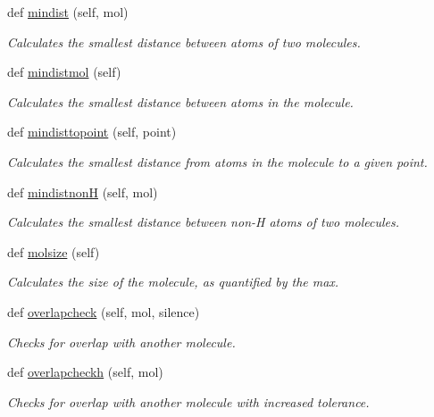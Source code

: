 \begin{DoxyCompactItemize}
def \hyperlink{classmolSimplify_1_1Classes_1_1mol3D_1_1mol3D_ab051fea5908eab8ddcd39d4ea4688657}{mindist} (self, mol)
\begin{DoxyCompactList}\small\item\em Calculates the smallest distance between atoms of two molecules. \end{DoxyCompactList}\item 
def \hyperlink{classmolSimplify_1_1Classes_1_1mol3D_1_1mol3D_abc383cd8e5f7a2963b5b220fe5f23c02}{mindistmol} (self)
\begin{DoxyCompactList}\small\item\em Calculates the smallest distance between atoms in the molecule. \end{DoxyCompactList}\item 
def \hyperlink{classmolSimplify_1_1Classes_1_1mol3D_1_1mol3D_a9002b30e6f3e13fb41c0080f4fec6ce1}{mindisttopoint} (self, point)
\begin{DoxyCompactList}\small\item\em Calculates the smallest distance from atoms in the molecule to a given point. \end{DoxyCompactList}\item 
def \hyperlink{classmolSimplify_1_1Classes_1_1mol3D_1_1mol3D_a613d343492efdeda0c47700654157b3d}{mindistnonH} (self, mol)
\begin{DoxyCompactList}\small\item\em Calculates the smallest distance between non-\/H atoms of two molecules. \end{DoxyCompactList}\item 
def \hyperlink{classmolSimplify_1_1Classes_1_1mol3D_1_1mol3D_aec0cabe05c899a3825c523add5e352ce}{molsize} (self)
\begin{DoxyCompactList}\small\item\em Calculates the size of the molecule, as quantified by the max. \end{DoxyCompactList}\item 
def \hyperlink{classmolSimplify_1_1Classes_1_1mol3D_1_1mol3D_aab1e703e70f941dfc764a47dfdd6a121}{overlapcheck} (self, mol, silence)
\begin{DoxyCompactList}\small\item\em Checks for overlap with another molecule. \end{DoxyCompactList}\item 
def \hyperlink{classmolSimplify_1_1Classes_1_1mol3D_1_1mol3D_a52aafa6742ea7f501a30b286bedfc4f4}{overlapcheckh} (self, mol)
\begin{DoxyCompactList}\small\item\em Checks for overlap with another molecule with increased tolerance. \end{DoxyCompactList}\item 

\end{DoxyCompactItemize}
